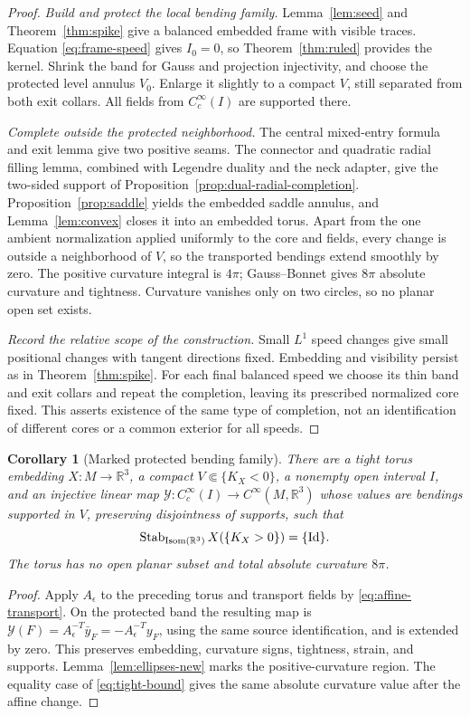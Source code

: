 \documentclass[11pt]{amsart}
\newtheorem{corollary}[theorem]{Corollary}
\theoremstyle{definition}
\theoremstyle{remark}
\newcommand{\R}{\mathbb R}\newcommand{\Sph}{\mathbb S}
\DeclareMathOperator{\Isom}{Isom}\DeclareMathOperator{\Emb}{Emb}
\numberwithin{equation}{section}
\begin{document}
\begin{proof}
\emph{Build and protect the local bending family.}
Lemma~\ref{lem:seed} and Theorem~\ref{thm:spike} give a balanced embedded
frame with visible traces. Equation \eqref{eq:frame-speed} gives $I_0=0$,
so Theorem~\ref{thm:ruled} provides the kernel. Shrink the band for Gauss
and projection injectivity, and choose the protected level annulus $V_0$.
Enlarge it slightly to a compact $V$, still separated from both exit
collars. All fields from $C_c^\infty(I)$ are supported there.

\emph{Complete outside the protected neighborhood.}
The central mixed-entry formula and exit lemma give two positive seams.
The connector and quadratic radial filling lemma, combined with
Legendre duality and the neck adapter, give the two-sided support
of Proposition~\ref{prop:dual-radial-completion}.
Proposition~\ref{prop:saddle} yields the embedded saddle annulus, and
Lemma~\ref{lem:convex} closes it into an embedded torus. Apart from the
one ambient normalization applied uniformly to the core and fields,
every change is outside a neighborhood of $V$, so the transported
bendings extend smoothly by zero.
The positive curvature integral is $4\pi$; Gauss--Bonnet gives $8\pi$
absolute curvature and tightness. Curvature vanishes only on two circles,
so no planar open set exists.

\emph{Record the relative scope of the construction.}
Small $L^1$ speed changes give small positional changes with tangent
directions fixed. Embedding and visibility persist as in
Theorem~\ref{thm:spike}. For each final balanced speed we choose its thin
band and exit collars and repeat the completion, leaving its prescribed
normalized core fixed. This asserts existence of the same type of completion, not
an identification of different cores or a common exterior for all speeds.
\end{proof}

\begin{corollary}[Marked protected bending family]\label{cor:marked-module}
There are a tight torus embedding $X:M\to\R^3$, a compact
$V\Subset\{K_X<0\}$, a nonempty open interval $I$, and an injective
linear map $\mathcal Y:C_c^\infty(I)\to C^\infty(M,\R^3)$ whose values
are bendings supported in $V$, preserving disjointness of supports, such
that
\[
 \Stab_{\Isom(\R^3)}X(\{K_X>0\})=\{\Id\}.
\]
The torus has no open planar subset and total absolute curvature $8\pi$.
\end{corollary}
\begin{proof}
Apply $A_\epsilon$ to the preceding torus and transport fields by
\eqref{eq:affine-transport}. On the protected band the resulting map is
$\mathcal Y(F)=A_\epsilon^{-T}\bar y_F=-A_\epsilon^{-T}y_F$,
using the same source identification, and is extended by zero.
This preserves embedding, curvature signs,
tightness, strain, and supports. Lemma~\ref{lem:ellipses-new} marks the
positive-curvature region. The equality case of \eqref{eq:tight-bound}
gives the same absolute curvature value after the affine change.
\end{proof}
\end{document}
